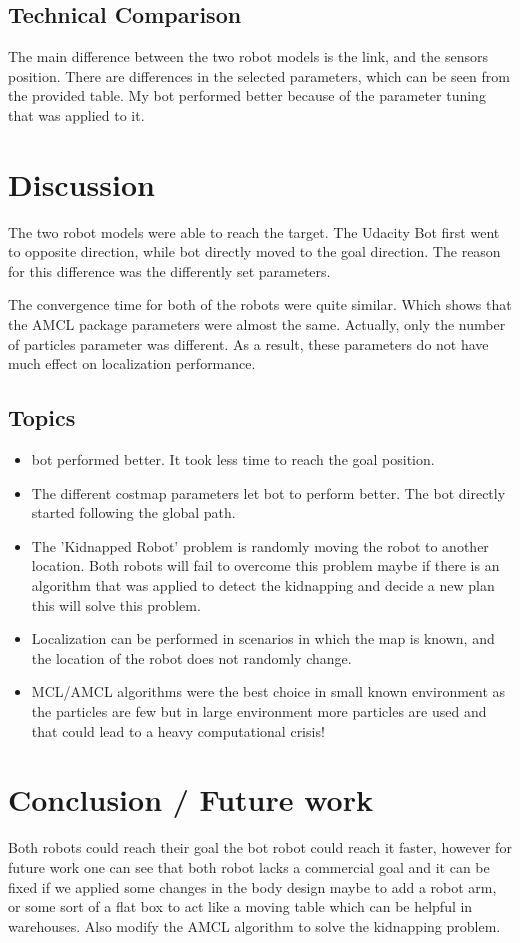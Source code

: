 \documentclass[10pt,journal,compsoc]{IEEEtran}
\begin{document}
\subsection{Technical Comparison} %
The main difference between the two robot models is the link, and the sensors position. There are differences in the selected parameters, which can be seen from the provided table. My bot  performed better because of the parameter tuning that was applied to it.

\section{Discussion}
The two robot models were able to reach the target. The Udacity Bot first went to opposite direction, while bot directly moved to the goal direction. The reason for this difference was the differently set parameters.

The convergence time for both of the robots were quite similar. Which shows that the AMCL package parameters were almost the same. Actually, only the number of particles parameter was different. As a result, these parameters do not have much effect on localization performance.

\subsection{Topics}
\begin{itemize}
\item bot performed better. It took less time to reach the goal position.
\item The different costmap parameters let bot to perform better. The bot directly started following the global path.
\item The 'Kidnapped Robot' problem is randomly moving the robot to another location. Both robots will fail to overcome this problem maybe if there is an algorithm that was applied to detect the kidnapping and decide a new plan this will solve this problem. 
\item Localization can be performed in scenarios in which the map is known, and the location of the robot does not randomly change.
\item MCL/AMCL algorithms were the best choice in small known environment as the particles are few but in large environment more particles are used and that could lead to a heavy computational crisis!
\end {itemize}

\section{Conclusion / Future work}
Both robots could reach their goal the bot robot could reach it faster, however for future work one can see that both robot lacks a commercial goal and it can be fixed if we applied some changes in the body design maybe to add a robot arm, or some sort of a flat box to act like a moving table which can be helpful in warehouses. Also modify the AMCL algorithm to solve the kidnapping problem.
\end{document}
